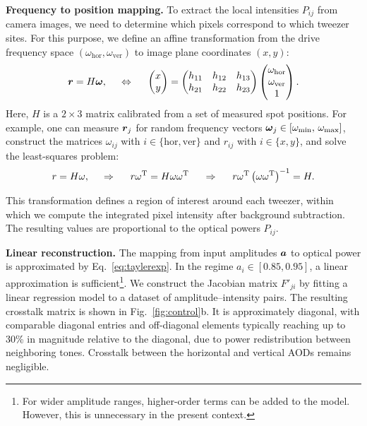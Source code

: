 \textbf{Frequency to position mapping.}
To extract the local intensities $P_{ij}$ from camera images, we need to determine which pixels correspond to which tweezer sites. For this purpose, we define an affine transformation from the drive frequency space $(\omega_{\mathrm{hor}}, \omega_{\mathrm{ver}})$ to image plane coordinates $(x, y)$:
\begin{equation*}
    \boldsymbol{r} = H \boldsymbol{\omega},
    \hspace{5 mm} \Leftrightarrow \hspace{5 mm} 
    \begin{pmatrix}
        x \\ y
    \end{pmatrix} = \begin{pmatrix}
        h_{11} & h_{12} & h_{13} \\
        h_{21} & h_{22} & h_{23}
    \end{pmatrix} 
    \begin{pmatrix}
        \omega_{\textnormal{hor}} \\
        \omega_{\textnormal{ver}} \\
        1
    \end{pmatrix}.
\end{equation*}
Here, $H$ is a $2 \times 3$ matrix calibrated from a set of measured spot positions. For example, one can measure $\boldsymbol{r}_j$ for random frequency vectors $\boldsymbol{\omega}_j \in [\omega_{\mathrm{min}},\, \omega_{\mathrm{max}}]$, construct the matrices $\omega_{ij}$ with $i \in \{\mathrm{hor}, \mathrm{ver}\}$ and $r_{ij}$ with $i \in \{x, y\}$, and solve the least-squares problem:
\begin{equation}
    r = H \omega,
    \hspace{0.5cm} \Rightarrow \hspace{0.5cm}
    r \omega^\mathrm{T} = H \omega \omega^\mathrm{T}
    \hspace{0.5cm} \Rightarrow \hspace{0.5cm}
    r \omega^\mathrm{T} \left(\omega \omega^\mathrm{T}\right)^{-1} = H.
    \label{eq:linreg-freq2pos}
\end{equation}

This transformation defines a region of interest around each tweezer, within which we compute the integrated pixel intensity after background subtraction. The resulting values are proportional to the optical powers $P_{ij}$.

\textbf{Linear reconstruction.}
The mapping from input amplitudes $\boldsymbol{a}$ to optical power is approximated by Eq.~\eqref{eq:taylerexp}. In the regime $a_i \in [0.85, 0.95]$, a linear approximation is sufficient\footnote{
    For wider amplitude ranges, higher-order terms can be added to the model. However, this is unnecessary in the present context.
}. We construct the Jacobian matrix $F'_{ji}$ by fitting a linear regression model to a dataset of amplitude–intensity pairs. The resulting crosstalk matrix is shown in Fig.~\ref{fig:control}b. It is approximately diagonal, with comparable diagonal entries and off-diagonal elements typically reaching up to 30\% in magnitude relative to the diagonal, due to power redistribution between neighboring tones. Crosstalk between the horizontal and vertical AODs remains negligible.

